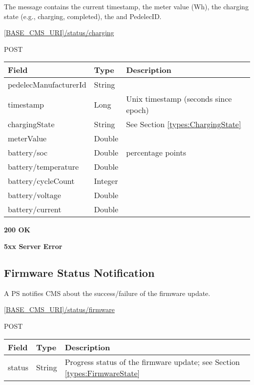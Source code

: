 The message contains the current timestamp, the meter value (Wh), the charging state (e.g., charging, completed), the and PedelecID.

 \url{[BASE_CMS_URI]/status/charging}

 POST

\begin{table}[!h]
\vspace{-7mm}
\begin{tabularx}{\linewidth}{ | l | l | X | }
  \hline
  \rowcolor{table-head}
  Field & Type & Description \\
  \hline
  	pedelecManufacturerId & String			& \\
  	timestamp & Long			& Unix timestamp (seconds since epoch) \\
  	chargingState & String		& See Section \ref{types:ChargingState} \\	
  	meterValue & Double & \\
  	battery/soc & Double & percentage points \\
  	battery/temperature & Double &  \\
  	battery/cycleCount & Integer &  \\
  	battery/voltage & Double &  \\
  	battery/current & Double &  \\
    \hline
\end{tabularx}
\end{table}

 \textbf{200 OK}

 \textbf{5xx Server Error}

\subsection{Firmware Status Notification}

A \acs{PS} notifies \acs{CMS} about the success/failure of the firmware update. 

 \url{[BASE_CMS_URI]/status/firmware}

 POST

\begin{tabularx}{\linewidth}{ | l | l | X | }
  \hline
  \rowcolor{table-head}
  Field & Type & Description \\
  \hline
  	status & String			& Progress status of the firmware update; see Section \ref{types:FirmwareState} \\	
  \hline
\end{tabularx}

